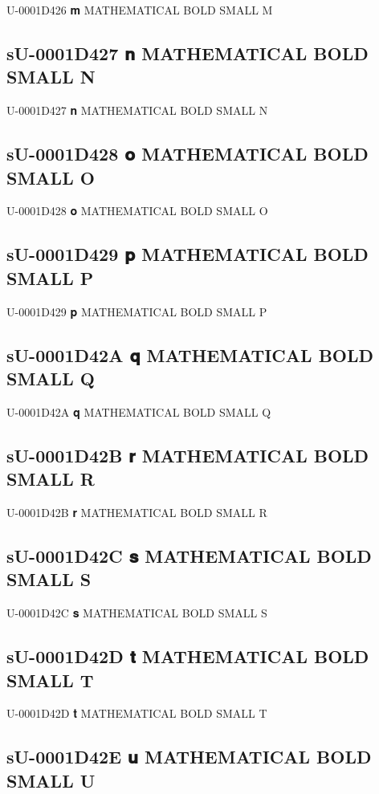 U-0001D426 𝐦 MATHEMATICAL BOLD SMALL M

\subsection{sU-0001D427 𝐧 MATHEMATICAL BOLD SMALL N}

U-0001D427 𝐧 MATHEMATICAL BOLD SMALL N

\subsection{sU-0001D428 𝐨 MATHEMATICAL BOLD SMALL O}

U-0001D428 𝐨 MATHEMATICAL BOLD SMALL O

\subsection{sU-0001D429 𝐩 MATHEMATICAL BOLD SMALL P}

U-0001D429 𝐩 MATHEMATICAL BOLD SMALL P

\subsection{sU-0001D42A 𝐪 MATHEMATICAL BOLD SMALL Q}

U-0001D42A 𝐪 MATHEMATICAL BOLD SMALL Q

\subsection{sU-0001D42B 𝐫 MATHEMATICAL BOLD SMALL R}

U-0001D42B 𝐫 MATHEMATICAL BOLD SMALL R

\subsection{sU-0001D42C 𝐬 MATHEMATICAL BOLD SMALL S}

U-0001D42C 𝐬 MATHEMATICAL BOLD SMALL S

\subsection{sU-0001D42D 𝐭 MATHEMATICAL BOLD SMALL T}

U-0001D42D 𝐭 MATHEMATICAL BOLD SMALL T

\subsection{sU-0001D42E 𝐮 MATHEMATICAL BOLD SMALL U}

